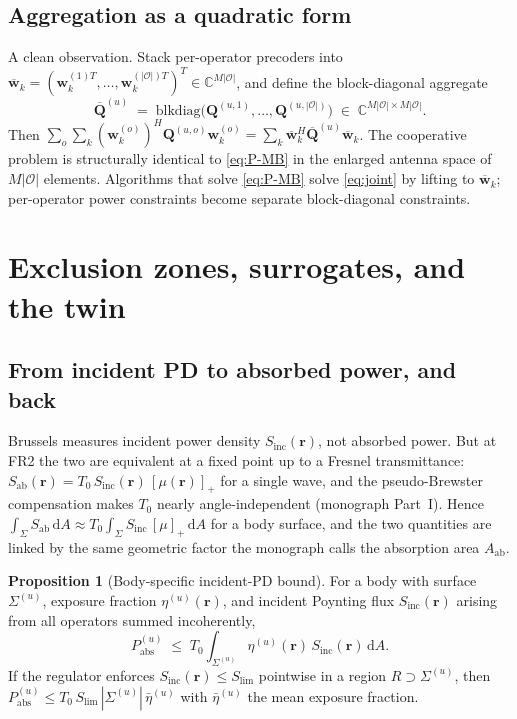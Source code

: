 \documentclass[11pt,a4paper]{article}
\theoremstyle{definition}
\newtheorem{proposition}[proposition]{Proposition}
\newcommand{\rr}{\mathbf{r}}
\newcommand{\ww}{\mathbf{w}}
\newcommand{\Sab}{S_{\mathrm{ab}}}
\newcommand{\Pabs}{P_{\mathrm{abs}}}
\newcommand{\Sinc}{S_{\mathrm{inc}}}
\newcommand{\Q}{\mathbf{Q}}
\newcommand{\diff}{\mathrm{d}}
\newcommand{\Complex}{\mathbb{C}}
\newcommand{\Ops}{\mathcal{O}}
\begin{document}
\subsection{Aggregation as a quadratic form}

A clean observation. Stack per-operator precoders into
$\overline{\ww}_k = (\ww_k^{(1)T},\ldots,\ww_k^{(|\Ops|)T})^T
\in\Complex^{M|\Ops|}$, and define the block-diagonal aggregate
\[
  \overline{\Q}^{(u)}
  \;=\;\mathrm{blkdiag}\bigl(\Q^{(u,1)},\ldots,\Q^{(u,|\Ops|)}\bigr)
  \;\in\;\Complex^{M|\Ops|\times M|\Ops|}.
\]
Then
$\sum_o\sum_k(\ww_k^{(o)})^H\Q^{(u,o)}\ww_k^{(o)}
=\sum_k\overline{\ww}_k^H\overline{\Q}^{(u)}\overline{\ww}_k$.
The cooperative problem is structurally identical to \eqref{eq:P-MB}
in the enlarged antenna space of $M|\Ops|$ elements. Algorithms that
solve \eqref{eq:P-MB} solve \eqref{eq:joint} by lifting to
$\overline{\ww}_k$; per-operator power constraints become separate
block-diagonal constraints.

\section{Exclusion zones, surrogates, and the twin}\label{sec:exclusion}

\subsection{From incident PD to absorbed power, and back}

Brussels measures incident power density $\Sinc(\rr)$, not absorbed
power. But at FR2 the two are equivalent at a fixed point up to a
Fresnel transmittance: $\Sab(\rr)=T_0\,\Sinc(\rr)\,[\mu(\rr)]_+$ for a
single wave, and the pseudo-Brewster compensation makes $T_0$ nearly
angle-independent (monograph Part~I). Hence
$\int_\Sigma\Sab\,\diff A \approx T_0 \int_\Sigma \Sinc\,[\mu]_+\,\diff A$
for a body surface, and the two quantities are linked by the same
geometric factor the monograph calls the absorption area $A_{\mathrm{ab}}$.

\begin{proposition}[Body-specific incident-PD bound]
For a body with surface $\Sigma^{(u)}$, exposure fraction
$\eta^{(u)}(\rr)$, and incident Poynting flux $\Sinc(\rr)$ arising
from all operators summed incoherently,
\[
  \Pabs^{(u)}
  \;\le\;T_0 \int_{\Sigma^{(u)}} \eta^{(u)}(\rr)\,\Sinc(\rr)\,\diff A.
\]
If the regulator enforces
$\Sinc(\rr)\le S_{\mathrm{lim}}$ pointwise in a region
$R\supset\Sigma^{(u)}$, then
$\Pabs^{(u)}\le T_0\,S_{\mathrm{lim}}\,|\Sigma^{(u)}|\,\bar\eta^{(u)}$
with $\bar\eta^{(u)}$ the mean exposure fraction.
\end{proposition}
\end{document}
